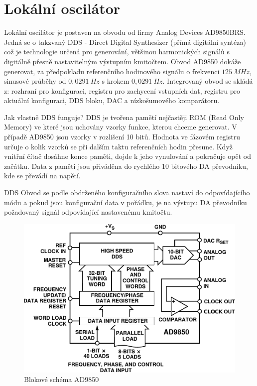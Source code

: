 \clearpage
\section{Lokální oscilátor}
\indent\indent Lokální oscilátor je postaven na obvodu od firmy Analog Devices AD9850BRS. Jedná se o takzvaný DDS - Direct Digital Synthesizer (přímá digitální syntéza) což je technologie určená pro generování, většinou harmonických signálů s digitálně přesně nastavitelným výstupním kmitočtem. Obvod AD9850 dokáže generovat, za předpokladu referenčního hodinového signálu o frekvenci $125~MHz$, sinusové průběhy od $0,0291~Hz$ s krokem $0,0291~Hz$. Integrovaný obvod se skládá z: rozhraní pro konfiguraci, registru pro zachycení vstupních dat, registru pro aktuální konfiguraci, DDS bloku, DAC a nízkošumového komparátoru.

Jak vlastně DDS funguje? DDS je tvořena pamětí nejčastěji ROM (Read Only Memory) ve které jsou uchovány vzorky funkce, kterou chceme generovat. V případě AD9850 jsou vzorky v rozlišení 10 bitů. Hodnota ve fázovém registru určuje o kolik vzorků se při dalším taktu referenčních hodin přesune. Když vnitřní čítač dosáhne konce paměti, dojde k jeho vynulování a pokračuje opět od začátku. Data z paměti jsou přiváděna  do rychlého 10 bitového DA převodníku, kde se převádí na napětí.  			
  			
DDS Obvod se podle obdrženého konfiguračního slova nastaví do odpovídajícího módu a pokud jsou konfigurační data v pořádku, je na výstupu DA převodníku požadovaný signál odpovídající nastavenému kmitočtu.

\begin{figure}[H]
	\centering
	\includegraphics[width=140mm]{img/lo/AD9850_bd.pdf}
	\caption{Blokové schéma AD9850}    		
\end{figure}

